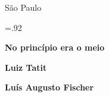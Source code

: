               \medskip

              {\selectfont\minion\small
              São Paulo \quad\the\year}
\endgroup
\pagebreak

\begingroup 

\footnotesize\parindent0pt\parskip5pt\thispagestyle{empty} 
\vspace*{.1\textheight}\mbox{} \vfill
\baselineskip=.92\baselineskip
\thispagestyle{empty}

\textbf{No princípio era o meio} \lipsum[1]

\textbf{Luiz Tatit} \lipsum[2]

\textbf{Luís Augusto Fischer} \lipsum[3]


\endgroup
\pagebreak